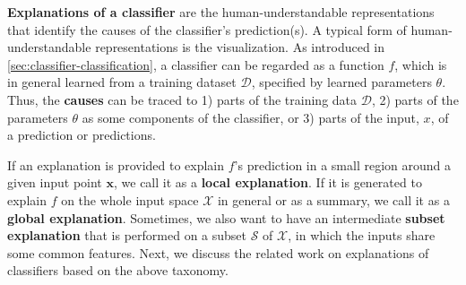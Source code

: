 \textbf{Explanations of a classifier} are the human-understandable representations that identify the causes of the classifier's prediction(s). A typical form of human-understandable representations is the visualization. As introduced in \autoref{sec:classifier-classification}, a classifier can be regarded as a function $f$, which is in general learned from a training dataset $\mathcal{D}$, specified by learned parameters $\theta$. Thus, the \textbf{causes} can be traced to 1) parts of the training data $\mathcal{D}$, 2) parts of the parameters $\theta$ as some components of the classifier, or 3) parts of the input, $x$, of a prediction or predictions. 

If an explanation is provided to explain $f$'s prediction in a small region around a given input point $\mathbf{x}$, we call it as a \textbf{local explanation}. If it is generated to explain $f$ on the whole input space $\mathcal{X}$ in general or as a summary, we call it as a \textbf{global explanation}. Sometimes, we also want to have an intermediate \textbf{subset explanation} that is performed on a subset $\mathcal{S}$ of $\mathcal{X}$, in which the inputs share some common features. 
Next, we discuss the related work on explanations of classifiers based on the above taxonomy. 








